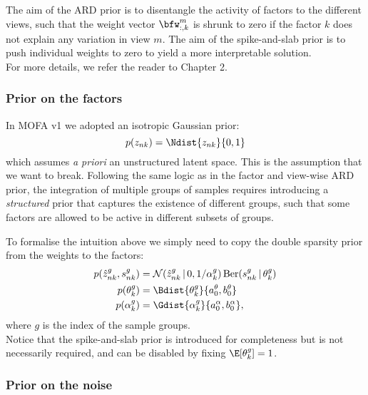 The aim of the ARD prior is to disentangle the activity of factors to the different views, such that the weight vector $\bfw_{:,k}^m$ is shrunk to zero if the factor $k$ does not explain any variation in view $m$. The aim of the spike-and-slab prior is to push individual weights to zero to yield a more interpretable solution.\\
For more details, we refer the reader to Chapter 2.


\subsubsection{Prior on the factors}

In MOFA v1 we adopted an isotropic Gaussian prior:
\begin{equation}
	p(z_{nk}) = \Ndist{z_{nk}}{0,1}
\end{equation}
which assumes \textit{a priori} an unstructured latent space. This is the assumption that we want to break. Following the same logic as in the factor and view-wise ARD prior, the integration of multiple groups of samples requires introducing a \textit{structured} prior that captures the existence of different groups, such that some factors are allowed to be active in different subsets of groups.

To formalise the intuition above we simply need to copy the double sparsity prior from the weights to the factors:
\begin{align}
	p(\hat{z}_{nk}^g,s_{nk}^g) &= \mathcal{N} (\hat{z}_{nk}^g \,|\, 0, 1/\alpha_k^g)\, \text{Ber}(s_{nk}^g \,|\,\theta_k^g) \\
	p(\theta_k^g) &= \Bdist{\theta_k^g}{a_0^\theta,b_0^\theta} \\
	p(\alpha_k^g) &= \Gdist{\alpha_k^g}{a_0^\alpha, b_0^\alpha},
\end{align}
where $g$ is the index of the sample groups.\\
Notice that the spike-and-slab prior is introduced for completeness but is not necessarily required, and can be disabled by fixing $\E[\theta_k^g]=1$.

\subsubsection{Prior on the noise}

